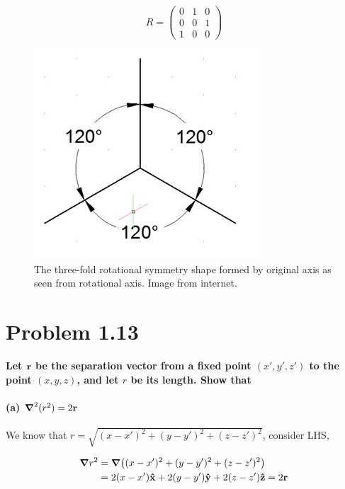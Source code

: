 \documentclass{article}
\numberwithin{equation}{section}
\begin{document}
\begin{equation}
    R = \begin{pmatrix}
        0 & 1 & 0 \\ 0 & 0 & 1 \\ 1 & 0 & 0
    \end{pmatrix}
\end{equation}

\begin{figure}[!htb]
    \centering
   \begin{minipage}{0.48\textwidth}
     \includegraphics[width=.7\linewidth]{hw/hw1/2.1.jpg}
     \caption{The three-fold rotational symmetry shape formed by original axis as seen from rotational axis. Image from internet.}\label{Fig: 2.1}
   \end{minipage}
\end{figure}

\section{Problem 1.13}

\textbf{Let $\vb{r}$ be the separation vector from a fixed point $(x',y',z')$ to the point $(x,y,z)$, and let $r $ be its length. Show that}

\paragraph{(a) $\grad^2 (r^2) = 2 \vb{r}$ \\}

We know that $r = \sqrt{(x-x')^2 + (y-y')^2 + (z-z')^2}$, consider LHS,

\begin{equation}
\begin{split}
    \grad r^2 &= \grad ((x-x')^2 + (y-y')^2 + (z-z')^2) \\
    &= 2(x-x') \vb{\hat{x}} + 2(y-y') \vb{\hat{y}} + 2(z-z') \vb{\hat{z}} = 2 \vb{r}
\end{split}
\end{equation}
\end{document}
